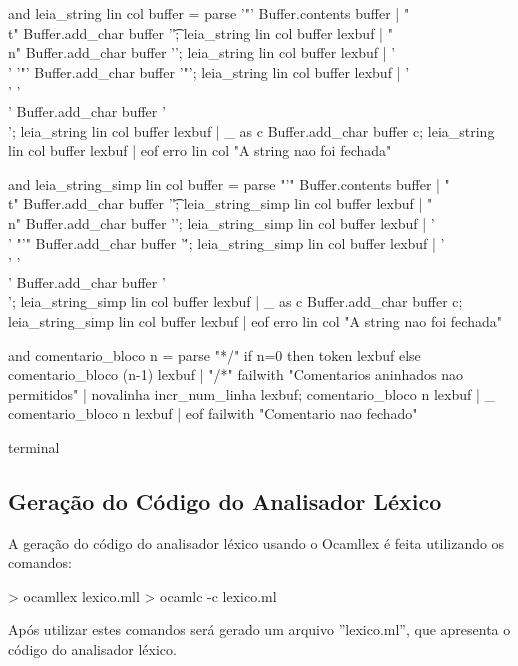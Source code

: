 \documentclass[12pt,a4paper,twoside]{article}
\begin{document}
\begin{terminal}
and leia_string lin col buffer = parse
'"' { Buffer.contents buffer}
| "\\t" { Buffer.add_char buffer '\t';
leia_string lin col buffer lexbuf }
| "\\n" { Buffer.add_char buffer '\n';
leia_string lin col buffer lexbuf }
| '\\' '"' { Buffer.add_char buffer '"';
leia_string lin col buffer lexbuf }
| '\\' '\\' { Buffer.add_char buffer '\\';
leia_string lin col buffer lexbuf }
| _ as c { Buffer.add_char buffer c;
leia_string lin col buffer lexbuf }
| eof { erro lin col "A string nao foi fechada"}

and leia_string_simp lin col buffer = parse
"'" { Buffer.contents buffer}
| "\\t" { Buffer.add_char buffer '\t';
leia_string_simp lin col buffer lexbuf }
| "\\n" { Buffer.add_char buffer '\n';
leia_string_simp lin col buffer lexbuf }
| '\\' "'" { Buffer.add_char buffer '\'';
leia_string_simp lin col buffer lexbuf }
| '\\' '\\' { Buffer.add_char buffer '\\';
leia_string_simp lin col buffer lexbuf }
| _ as c { Buffer.add_char buffer c;
leia_string_simp lin col buffer lexbuf }
| eof { erro lin col "A string nao foi fechada"}

and comentario_bloco n = parse
"*/"        { if n=0 then token lexbuf
              else comentario_bloco (n-1) lexbuf }
| "/*"      { failwith "Comentarios aninhados nao permitidos" }
| novalinha { incr_num_linha lexbuf;
              comentario_bloco n lexbuf }
| _         { comentario_bloco n lexbuf }
| eof       { failwith "Comentario nao fechado" }
\end{terminal}{terminal}

\subsection{Geração do Código do Analisador Léxico}
A geração do código do analisador léxico usando o Ocamllex é feita utilizando os comandos:
\begin{terminal}
	> ocamllex lexico.mll
	> ocamlc -c lexico.ml
\end{terminal}	
Após utilizar estes comandos será gerado um arquivo ”lexico.ml”, que apresenta o código do analisador léxico.
\end{document}

